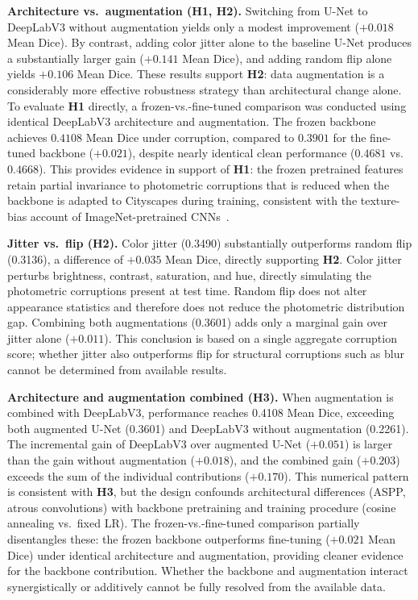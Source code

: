 \documentclass[conference]{IEEEtran}
\begin{document}
\textbf{Architecture vs.\ augmentation (H1, H2).}
Switching from U-Net to DeepLabV3 without augmentation yields only a modest improvement ($+0.018$ Mean Dice). By contrast, adding color jitter alone to the baseline U-Net produces a substantially larger gain ($+0.141$ Mean Dice), and adding random flip alone yields $+0.106$ Mean Dice. These results support \textbf{H2}: data augmentation is a considerably more effective robustness strategy than architectural change alone. To evaluate \textbf{H1} directly, a frozen-vs.-fine-tuned comparison was conducted using identical DeepLabV3 architecture and augmentation. The frozen backbone achieves $0.4108$ Mean Dice under corruption, compared to $0.3901$ for the fine-tuned backbone ($+0.021$), despite nearly identical clean performance ($0.4681$ vs.\ $0.4668$). This provides evidence in support of \textbf{H1}: the frozen pretrained features retain partial invariance to photometric corruptions that is reduced when the backbone is adapted to Cityscapes during training, consistent with the texture-bias account of ImageNet-pretrained CNNs~\cite{geirhos2019}.

\textbf{Jitter vs.\ flip (H2).}
Color jitter (0.3490) substantially outperforms random flip (0.3136), a difference of $+0.035$ Mean Dice, directly supporting \textbf{H2}. Color jitter perturbs brightness, contrast, saturation, and hue, directly simulating the photometric corruptions present at test time. Random flip does not alter appearance statistics and therefore does not reduce the photometric distribution gap. Combining both augmentations (0.3601) adds only a marginal gain over jitter alone ($+0.011$). This conclusion is based on a single aggregate corruption score; whether jitter also outperforms flip for structural corruptions such as blur cannot be determined from available results.

\textbf{Architecture and augmentation combined (H3).}
When augmentation is combined with DeepLabV3, performance reaches 0.4108 Mean Dice, exceeding both augmented U-Net (0.3601) and DeepLabV3 without augmentation (0.2261). The incremental gain of DeepLabV3 over augmented U-Net ($+0.051$) is larger than the gain without augmentation ($+0.018$), and the combined gain ($+0.203$) exceeds the sum of the individual contributions ($+0.170$). This numerical pattern is consistent with \textbf{H3}, but the design confounds architectural differences (ASPP, atrous convolutions) with backbone pretraining and training procedure (cosine annealing vs.\ fixed LR). The frozen-vs.-fine-tuned comparison partially disentangles these: the frozen backbone outperforms fine-tuning ($+0.021$ Mean Dice) under identical architecture and augmentation, providing cleaner evidence for the backbone contribution. Whether the backbone and augmentation interact synergistically or additively cannot be fully resolved from the available data.
\end{document}
